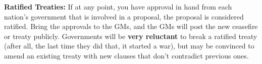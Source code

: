\documentclass[green]{GL2020}
\begin{document}
\textbf{Ratified Treaties:}
If at any point, you have approval in hand from each nation’s government that is involved in a proposal, the proposal is considered ratified. Bring the approvals to the GMs, and the GMs will post the new ceasefire or treaty publicly. Governments will be \textbf{very reluctant} to break a ratified treaty (after all, the last time they did that, it started a war), but may be convinced to amend an existing treaty with new clauses that don’t contradict previous ones.
\end{document}
